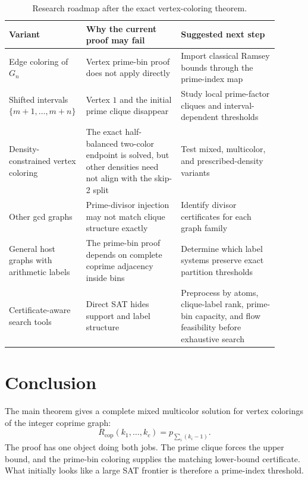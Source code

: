 \documentclass[11pt]{article}
\theoremstyle{plain}
\theoremstyle{definition}
\theoremstyle{remark}
\newcommand{\Rcop}{R_{\mathrm{cop}}}
\begin{document}
\begin{table}[htbp]
\centering
\caption{Research roadmap after the exact vertex-coloring theorem.}
\label{tab:variant-roadmap}
\small
\begin{tabular}{@{}>{\raggedright\arraybackslash}p{0.21\linewidth}>{\raggedright\arraybackslash}p{0.34\linewidth}>{\raggedright\arraybackslash}p{0.35\linewidth}@{}}
\toprule
Variant & Why the current proof may fail & Suggested next step \\
\midrule
Edge coloring of $G_n$ & Vertex prime-bin proof does not apply directly & Import classical Ramsey bounds through the prime-index map \\
Shifted intervals $\{m+1,\ldots,m+n\}$ & Vertex $1$ and the initial prime clique disappear & Study local prime-factor cliques and interval-dependent thresholds \\
Density-constrained vertex coloring & The exact half-balanced two-color endpoint is solved, but other densities need not align with the skip-2 split & Test mixed, multicolor, and prescribed-density variants \\
Other gcd graphs & Prime-divisor injection may not match clique structure exactly & Identify divisor certificates for each graph family \\
General host graphs with arithmetic labels & The prime-bin proof depends on complete coprime adjacency inside bins & Determine which label systems preserve exact partition thresholds \\
Certificate-aware search tools & Direct SAT hides support and label structure & Preprocess by atoms, clique-label rank, prime-bin capacity, and flow feasibility before exhaustive search \\
\bottomrule
\end{tabular}

\end{table}

\section{Conclusion}

The main theorem gives a complete mixed multicolor solution for vertex
colorings of the integer coprime graph:
\[
  \Rcop(k_1,\ldots,k_c)=p_{\sum_i(k_i-1)}.
\]
The proof has one object doing both jobs.  The prime clique forces the upper
bound, and the prime-bin coloring supplies the matching lower-bound
certificate.  What initially looks like a large SAT frontier is therefore a
prime-index threshold.
\end{document}
